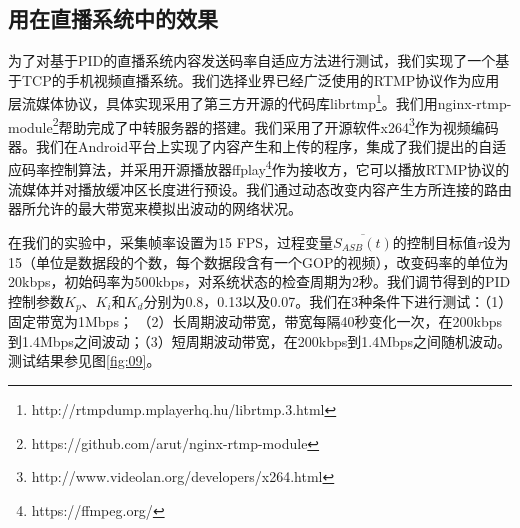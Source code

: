 \subsection{用在直播系统中的效果}

为了对基于PID的直播系统内容发送码率自适应方法进行测试，我们实现了一个基于TCP的手机视频直播系统。我们选择业界已经广泛使用的RTMP协议作为应用层流媒体协议，具体实现采用了第三方开源的代码库librtmp\footnote{http://rtmpdump.mplayerhq.hu/librtmp.3.html}。我们用nginx-rtmp-module\footnote{https://github.com/arut/nginx-rtmp-module}帮助完成了中转服务器的搭建。我们采用了开源软件x264\footnote{http://www.videolan.org/developers/x264.html}作为视频编码器。我们在Android平台上实现了内容产生和上传的程序，集成了我们提出的自适应码率控制算法，并采用开源播放器ffplay\footnote{https://ffmpeg.org/}作为接收方，它可以播放RTMP协议的流媒体并对播放缓冲区长度进行预设。我们通过动态改变内容产生方所连接的路由器所允许的最大带宽来模拟出波动的网络状况。

在我们的实验中，采集帧率设置为15 FPS，过程变量$\overline{S_{ASB}(t)}$的控制目标值$\tau$设为15（单位是数据段的个数，每个数据段含有一个GOP的视频），改变码率的单位为20kbps，初始码率为500kbps，对系统状态的检查周期为2秒。我们调节得到的PID控制参数$K_p$、$K_i$和$K_d$分别为0.8，0.13以及0.07。我们在3种条件下进行测试：（1）固定带宽为1Mbps；
（2）长周期波动带宽，带宽每隔40秒变化一次，在200kbps到1.4Mbps之间波动；（3）短周期波动带宽，在200kbps到1.4Mbps之间随机波动。测试结果参见图\ref{fig:09}。

